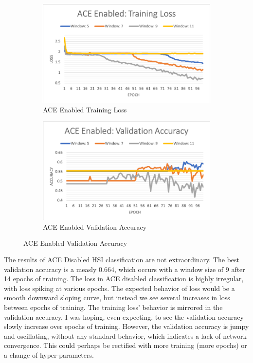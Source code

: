 \documentclass[12pt]{article}
\begin{document}
\begin{figure}
	\begin{subfigure}{0.45\linewidth}
		\includegraphics[width=\linewidth]{ace-enabled-loss.png}
		\caption{ACE Enabled Training Loss}
	\end{subfigure}
	\hfill
	\begin{subfigure}{0.45\linewidth}
		\includegraphics[width=\linewidth]{ace-enabled-valacc.png}
		\caption{ACE Enabled Validation Accuracy}		
	\end{subfigure}
\end{figure}


The results of ACE Disabled HSI classification are not extraordinary.
%
The best validation accuracy is a measly 0.664, which occurs with a window size of 9 after 14 epochs of training.
%
The loss in ACE disabled classification is highly irregular, with loss spiking at various epochs.
%
The expected behavior of loss would be a smooth downward sloping curve, but instead we see several increases in loss between epochs of training.
%
The training loss' behavior is mirrored in the validation accuracy. 
%
I was hoping, even expecting, to see the validation accuracy slowly increase over epochs of training. 
%
However, the validation accuracy is jumpy and oscillating, without any standard behavior, which indicates a lack of network convergence.
%
This could perhaps be rectified with more training (more epochs) or a change of hyper-parameters.
\end{document}
